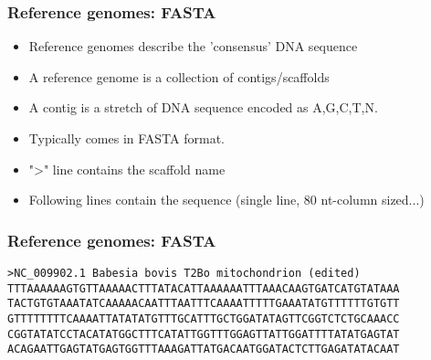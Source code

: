 \documentclass{beamer}
\begin{document}






\begin{frame}
  \frametitle{Reference genomes: FASTA}
  \begin{itemize}
  \item Reference genomes describe the 'consensus' DNA sequence 
  \item A reference genome is a collection of contigs/scaffolds
  \item  A contig is a stretch of DNA sequence encoded as A,G,C,T,N.	
  \item  Typically comes in FASTA format.		
  \item  ">" line contains the scaffold name
  \item  Following lines contain the sequence (single line, 80 nt-column sized...)
  \end{itemize}
\end{frame}

\begin{frame}[fragile]
  \frametitle{Reference genomes: FASTA}
\begin{small}
  \begin{verbatim}
>NC_009902.1 Babesia bovis T2Bo mitochondrion (edited)
TTTAAAAAAGTGTTAAAAACTTTATACATTAAAAAATTTAAACAAGTGATCATGTATAAA
TACTGTGTAAATATCAAAAACAATTTAATTTCAAAATTTTTGAAATATGTTTTTTGTGTT
GTTTTTTTTCAAAATTATATATGTTTGCATTTGCTGGATATAGTTCGGTCTCTGCAAACC
CGGTATATCCTACATATGGCTTTCATATTGGTTTGGAGTTATTGGATTTTATATGAGTAT
ACAGAATTGAGTATGAGTGGTTTAAAGATTATGACAATGGATACTCTTGAGATATACAAT
  \end{verbatim}
\end{small}
\end{frame}
\end{document}
